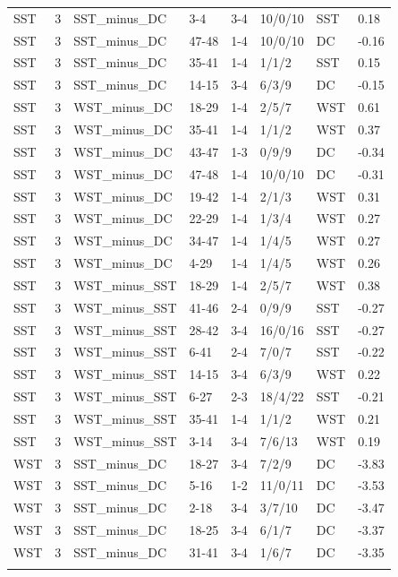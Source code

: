 \begin{table}[!h]
\begin{tabular}[t]{lrllllll}
\addlinespace
SST & 3 & SST_minus_DC & 3-4 & 3-4 & 10/0/10 & SST & 0.18\\
SST & 3 & SST_minus_DC & 47-48 & 1-4 & 10/0/10 & DC & -0.16\\
SST & 3 & SST_minus_DC & 35-41 & 1-4 & 1/1/2 & SST & 0.15\\
SST & 3 & SST_minus_DC & 14-15 & 3-4 & 6/3/9 & DC & -0.15\\
SST & 3 & WST_minus_DC & 18-29 & 1-4 & 2/5/7 & WST & 0.61\\
\addlinespace
SST & 3 & WST_minus_DC & 35-41 & 1-4 & 1/1/2 & WST & 0.37\\
SST & 3 & WST_minus_DC & 43-47 & 1-3 & 0/9/9 & DC & -0.34\\
SST & 3 & WST_minus_DC & 47-48 & 1-4 & 10/0/10 & DC & -0.31\\
SST & 3 & WST_minus_DC & 19-42 & 1-4 & 2/1/3 & WST & 0.31\\
SST & 3 & WST_minus_DC & 22-29 & 1-4 & 1/3/4 & WST & 0.27\\
\addlinespace
SST & 3 & WST_minus_DC & 34-47 & 1-4 & 1/4/5 & WST & 0.27\\
SST & 3 & WST_minus_DC & 4-29 & 1-4 & 1/4/5 & WST & 0.26\\
SST & 3 & WST_minus_SST & 18-29 & 1-4 & 2/5/7 & WST & 0.38\\
SST & 3 & WST_minus_SST & 41-46 & 2-4 & 0/9/9 & SST & -0.27\\
SST & 3 & WST_minus_SST & 28-42 & 3-4 & 16/0/16 & SST & -0.27\\
\addlinespace
SST & 3 & WST_minus_SST & 6-41 & 2-4 & 7/0/7 & SST & -0.22\\
SST & 3 & WST_minus_SST & 14-15 & 3-4 & 6/3/9 & WST & 0.22\\
SST & 3 & WST_minus_SST & 6-27 & 2-3 & 18/4/22 & SST & -0.21\\
SST & 3 & WST_minus_SST & 35-41 & 1-4 & 1/1/2 & WST & 0.21\\
SST & 3 & WST_minus_SST & 3-14 & 3-4 & 7/6/13 & WST & 0.19\\
\addlinespace
WST & 3 & SST_minus_DC & 18-27 & 3-4 & 7/2/9 & DC & -3.83\\
WST & 3 & SST_minus_DC & 5-16 & 1-2 & 11/0/11 & DC & -3.53\\
WST & 3 & SST_minus_DC & 2-18 & 3-4 & 3/7/10 & DC & -3.47\\
WST & 3 & SST_minus_DC & 18-25 & 3-4 & 6/1/7 & DC & -3.37\\
WST & 3 & SST_minus_DC & 31-41 & 3-4 & 1/6/7 & DC & -3.35\\
\addlinespace

\end{tabular}
\end{table}
